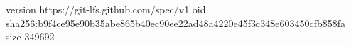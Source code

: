version https://git-lfs.github.com/spec/v1
oid sha256:b9f4ce95e90b35abe865b40ec90ee22ad48a4220e45f3c348e603450cfb858fa
size 349692
